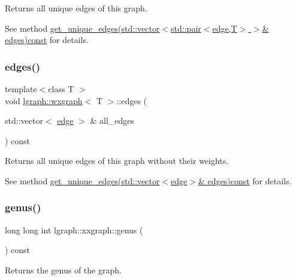 Returns all unique edges of this graph. 

See method \hyperlink{classlgraph_1_1wdgraph_a1b290b91e69ad2c6f667244763f7d709}{get\+\_\+unique\+\_\+edges(std\+::vector$<$std\+::pair$<$edge,\+T$>$ $>$\& edges)const} for details. \mbox{\label{classlgraph_1_1wxgraph_ae99b335ca0cc70f619ae7c186d2dc7ac}} 
\subsubsection{\texorpdfstring{edges()}{edges()}\hspace{0.1cm}{\footnotesize\ttfamily [2/2]}}
{\footnotesize\ttfamily template$<$class T $>$ \\
void \hyperlink{classlgraph_1_1wxgraph}{lgraph\+::wxgraph}$<$ T $>$\+::edges (\begin{DoxyParamCaption}\item[{std\+::vector$<$ \hyperlink{namespacelgraph_a76bd7d50719f03de7a85db259d80d572}{edge} $>$ \&}]{all\+\_\+edges }\end{DoxyParamCaption}) const\hspace{0.3cm}{\ttfamily [inherited]}}



Returns all unique edges of this graph without their weights. 

See method \hyperlink{classlgraph_1_1wdgraph_a291ce640bc2273ab23d3d8a545476e7a}{get\+\_\+unique\+\_\+edges(std\+::vector$<$edge$>$\& edges)const} for details. \mbox{\label{classlgraph_1_1xxgraph_a5f48a91046766e3e0b71a3326f2b9153}} 
\subsubsection{\texorpdfstring{genus()}{genus()}}
{\footnotesize\ttfamily long long int lgraph\+::xxgraph\+::genus (\begin{DoxyParamCaption}{ }\end{DoxyParamCaption}) const\hspace{0.3cm}{\ttfamily [inherited]}}



Returns the genus of the graph. 

